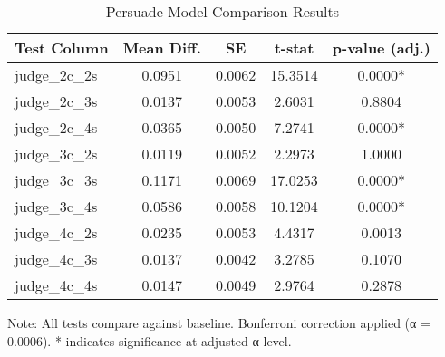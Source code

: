\begin{table}[htbp]
\centering
\caption{Persuade Model Comparison Results}
\label{tab:test_results}
\begin{tabular}{lcccc}
\toprule
Test Column & Mean Diff. & SE & t-stat & p-value (adj.) \\
\midrule
judge\_2c\_2s & 0.0951 & 0.0062 & 15.3514 & 0.0000* \\
judge\_2c\_3s & 0.0137 & 0.0053 & 2.6031 & 0.8804 \\
judge\_2c\_4s & 0.0365 & 0.0050 & 7.2741 & 0.0000* \\
judge\_3c\_2s & 0.0119 & 0.0052 & 2.2973 & 1.0000 \\
judge\_3c\_3s & 0.1171 & 0.0069 & 17.0253 & 0.0000* \\
judge\_3c\_4s & 0.0586 & 0.0058 & 10.1204 & 0.0000* \\
judge\_4c\_2s & 0.0235 & 0.0053 & 4.4317 & 0.0013 \\
judge\_4c\_3s & 0.0137 & 0.0042 & 3.2785 & 0.1070 \\
judge\_4c\_4s & 0.0147 & 0.0049 & 2.9764 & 0.2878 \\
\bottomrule
\end{tabular}
\begin{tablenotes}
\small
\item Note: All tests compare against baseline. 
Bonferroni correction applied (α = 0.0006). 
* indicates significance at adjusted α level.
\end{tablenotes}
\end{table}